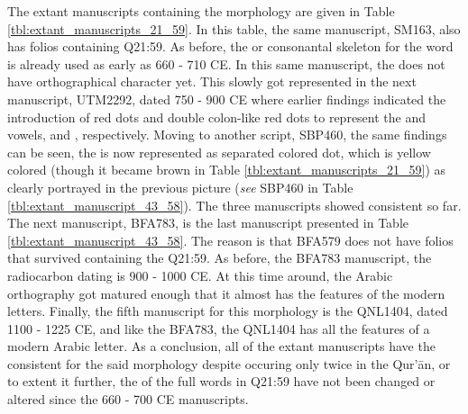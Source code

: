 The extant manuscripts containing the   morphology are given in Table \ref{tbl:extant_manuscripts_21_59}. In this table, the same manuscript, SM163, also has folios containing Q21:59. As before, the   or consonantal skeleton for the word   is already used as early as 660 - 710 CE. In this same manuscript, the   does not have orthographical character yet. This slowly got represented in the next manuscript, UTM2292, dated 750 - 900 CE where earlier findings indicated the introduction of red dots and double colon-like red dots to represent the   and vowels, and  , respectively. Moving to another script, SBP460, the same findings can be seen, the   is now represented as separated colored dot, which is yellow colored (though it became brown in Table \ref{tbl:extant_manuscripts_21_59}) as clearly portrayed in the previous picture (\textit{see} SBP460 in Table \ref{tbl:extant_manuscript_43_58}). The three manuscripts showed consistent   so far. The next manuscript, BFA783, is the last manuscript presented in Table \ref{tbl:extant_manuscript_43_58}. The reason is that BFA579 does not have folios that survived containing the Q21:59. As before, the BFA783 manuscript, the radiocarbon dating is 900 - 1000 CE. At this time around, the Arabic orthography got matured enough that it almost has the features of the modern letters. Finally, the fifth manuscript for this morphology is the QNL1404, dated 1100 - 1225 CE, and like the BFA783, the QNL1404 has all the features of a modern Arabic letter. As a conclusion, all of the extant manuscripts have the consistent   for the said morphology despite occuring only twice in the Qur'\=an, or to extent it further, the   of the full words in Q21:59 have not been changed or altered since the 660 - 700 CE manuscripts.

